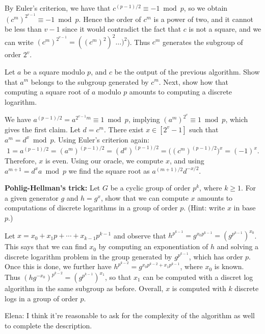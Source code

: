 \documentclass[11pt]{exam}
\theoremstyle{definition}
\begin{document}
{\begin{questions}
\begin{solution}
    By Euler's criterion, we have that $c^{(p-1)/2} \equiv -1 \bmod p$, so we obtain $(c^m)^{2^{v-1}} \equiv -1 \bmod p$. Hence the order of $c^m$ is a power of two, and it cannot be less than $v-1$ since it would contradict the fact that $c$ is not a square, and we can write $(c^m)^{2^{v-1}}=((c^m)^2)^2\dots)^2$). Thus $c^m$ generates the subgroup of order $2^v$. 
  \end{solution}

  \question Let $a$ be a square modulo $p$, and $c$ be the output of the previous algorithm. Show that $a^m$ belongs to the subgroup generated by $c^m$. Next, show how that computing a square root of $a$ modulo $p$ amounts to computing a discrete logarithm.

  \begin{solution}
    We have $a^{(p-1)/2}=a^{2^{v-1}m}\equiv 1 \bmod p$, implying $(a^m)^{2^v} \equiv 1 \bmod p$, which gives the first claim. Let $d=c^m$. There exist $x\in [2^{v}-1]$ such that $a^m = d^x \bmod p$. Using Euler's criterion again:
    $$ 1 = a^{(p-1)/2} = (a^m)^{(p-1)/2} = (d^x)^{(p-1)/2} = \big((c^m)^{(p-1)/2}\big)^x=(-1)^x.$$
    Therefore, $x$ is even. Using our oracle, we compute $x$, and using $a^{m+1} = d^xa \bmod p$ we find the square root as $a^{(m+1)/2}d^{-x/2}$.
  \end{solution}

  \question \textbf{Pohlig-Hellman's trick:} Let $G$ be a cyclic group of order $p^k$, where $k\geq 1$. For a given generator $g$ and $h=g^x$, show that we can compute $x$ amounts to computations of discrete logarithms in a group of order $p$. (Hint: write $x$ in base $p$.)

  \begin{solution}
    Let $x=x_0+x_1p+\dotsb+x_{k-1}p^{k-1}$ and observe that $h^{p^{k-1}} = g^{x_0p^{k-1}}=(g^{p^{k-1}})^{x_0}$. This says that we can find $x_0$ by computing an exponentiation of $h$ and solving a discrete logarithm problem in the group generated by $g^{p^{k-1}}$, which has order $p$. Once this is done, we further have $h^{p^{k-2}}=g^{x_0p^{k-2}+x_1p^{k-1}}$, where $x_0$ is known. Thus $(hg^{-x_0})^{p^{k-2}}=(g^{p^{k-1}})^{x_1}$, so that $x_1$ can be computed with a discret log algorithm in the same subgroup as before. Overall, $x$ is computed with $k$ discrete logs in a group of order $p$.
    
    Elena: I think it're reasonable to ask for the complexity of the algorithm as well to complete the description. 
    
  \end{solution}


\end{questions}}
\end{document}
